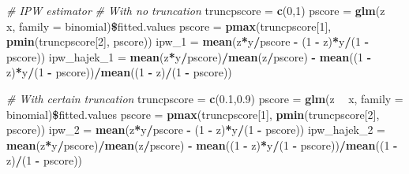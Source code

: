 \documentclass[]{article}
\newenvironment{Shaded}{\begin{snugshade}}{\end{snugshade}}
\newcommand{\KeywordTok}[1]{\textcolor[rgb]{0.13,0.29,0.53}{\textbf{#1}}}
\newcommand{\DataTypeTok}[1]{\textcolor[rgb]{0.13,0.29,0.53}{#1}}
\newcommand{\DecValTok}[1]{\textcolor[rgb]{0.00,0.00,0.81}{#1}}
\newcommand{\FloatTok}[1]{\textcolor[rgb]{0.00,0.00,0.81}{#1}}
\newcommand{\StringTok}[1]{\textcolor[rgb]{0.31,0.60,0.02}{#1}}
\newcommand{\CommentTok}[1]{\textcolor[rgb]{0.56,0.35,0.01}{\textit{#1}}}
\newcommand{\OperatorTok}[1]{\textcolor[rgb]{0.81,0.36,0.00}{\textbf{#1}}}
\newcommand{\NormalTok}[1]{#1}
\begin{document}
\begin{Shaded}
\begin{Highlighting}[]
\CommentTok{# IPW estimator}
\CommentTok{# With no truncation}
\NormalTok{truncpscore =}\StringTok{ }\KeywordTok{c}\NormalTok{(}\DecValTok{0}\NormalTok{,}\DecValTok{1}\NormalTok{)}
\NormalTok{pscore =}\StringTok{ }\KeywordTok{glm}\NormalTok{(z }\OperatorTok{~}\StringTok{ }\NormalTok{x, }\DataTypeTok{family =}\NormalTok{ binomial)}\OperatorTok{\$}\NormalTok{fitted.values}
\NormalTok{pscore =}\StringTok{ }\KeywordTok{pmax}\NormalTok{(truncpscore[}\DecValTok{1}\NormalTok{], }\KeywordTok{pmin}\NormalTok{(truncpscore[}\DecValTok{2}\NormalTok{], pscore))}
\NormalTok{ipw_}\DecValTok{1}\NormalTok{ =}\StringTok{ }\KeywordTok{mean}\NormalTok{(z}\OperatorTok{*}\NormalTok{y}\OperatorTok{/}\NormalTok{pscore }\OperatorTok{-}\StringTok{ }\NormalTok{(}\DecValTok{1} \OperatorTok{-}\StringTok{ }\NormalTok{z)}\OperatorTok{*}\NormalTok{y}\OperatorTok{/}\NormalTok{(}\DecValTok{1} \OperatorTok{-}\StringTok{ }\NormalTok{pscore))}
\NormalTok{ipw_hajek_}\DecValTok{1}\NormalTok{ =}\StringTok{ }\KeywordTok{mean}\NormalTok{(z}\OperatorTok{*}\NormalTok{y}\OperatorTok{/}\NormalTok{pscore)}\OperatorTok{/}\KeywordTok{mean}\NormalTok{(z}\OperatorTok{/}\NormalTok{pscore) }\OperatorTok{-}\StringTok{ }\KeywordTok{mean}\NormalTok{((}\DecValTok{1} \OperatorTok{-}\StringTok{ }\NormalTok{z)}\OperatorTok{*}\NormalTok{y}\OperatorTok{/}\NormalTok{(}\DecValTok{1} \OperatorTok{-}\StringTok{ }\NormalTok{pscore))}\OperatorTok{/}\KeywordTok{mean}\NormalTok{((}\DecValTok{1} \OperatorTok{-}\StringTok{ }\NormalTok{z)}\OperatorTok{/}\NormalTok{(}\DecValTok{1} \OperatorTok{-}\StringTok{ }\NormalTok{pscore))}

\CommentTok{# With certain truncation}
\NormalTok{truncpscore =}\StringTok{ }\KeywordTok{c}\NormalTok{(}\FloatTok{0.1}\NormalTok{,}\FloatTok{0.9}\NormalTok{)}
\NormalTok{pscore =}\StringTok{ }\KeywordTok{glm}\NormalTok{(z }\OperatorTok{~}\StringTok{ }\NormalTok{x, }\DataTypeTok{family =}\NormalTok{ binomial)}\OperatorTok{\$}\NormalTok{fitted.values}
\NormalTok{pscore =}\StringTok{ }\KeywordTok{pmax}\NormalTok{(truncpscore[}\DecValTok{1}\NormalTok{], }\KeywordTok{pmin}\NormalTok{(truncpscore[}\DecValTok{2}\NormalTok{], pscore))}
\NormalTok{ipw_}\DecValTok{2}\NormalTok{ =}\StringTok{ }\KeywordTok{mean}\NormalTok{(z}\OperatorTok{*}\NormalTok{y}\OperatorTok{/}\NormalTok{pscore }\OperatorTok{-}\StringTok{ }\NormalTok{(}\DecValTok{1} \OperatorTok{-}\StringTok{ }\NormalTok{z)}\OperatorTok{*}\NormalTok{y}\OperatorTok{/}\NormalTok{(}\DecValTok{1} \OperatorTok{-}\StringTok{ }\NormalTok{pscore))}
\NormalTok{ipw_hajek_}\DecValTok{2}\NormalTok{ =}\StringTok{ }\KeywordTok{mean}\NormalTok{(z}\OperatorTok{*}\NormalTok{y}\OperatorTok{/}\NormalTok{pscore)}\OperatorTok{/}\KeywordTok{mean}\NormalTok{(z}\OperatorTok{/}\NormalTok{pscore) }\OperatorTok{-}\StringTok{ }\KeywordTok{mean}\NormalTok{((}\DecValTok{1} \OperatorTok{-}\StringTok{ }\NormalTok{z)}\OperatorTok{*}\NormalTok{y}\OperatorTok{/}\NormalTok{(}\DecValTok{1} \OperatorTok{-}\StringTok{ }\NormalTok{pscore))}\OperatorTok{/}\KeywordTok{mean}\NormalTok{((}\DecValTok{1} \OperatorTok{-}\StringTok{ }\NormalTok{z)}\OperatorTok{/}\NormalTok{(}\DecValTok{1} \OperatorTok{-}\StringTok{ }\NormalTok{pscore))}


\end{Highlighting}
\end{Shaded}
\end{document}
